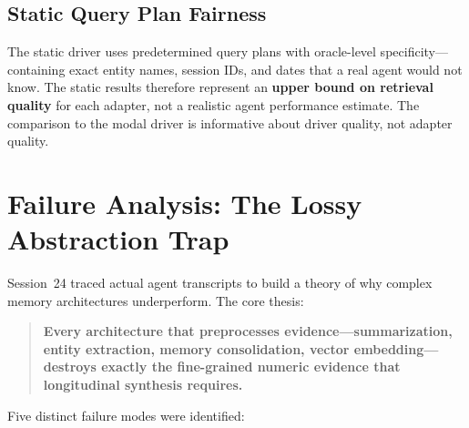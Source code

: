\documentclass[11pt,letterpaper]{article}
\begin{document}
\subsection{Static Query Plan Fairness}

The static driver uses predetermined query plans with oracle-level specificity---containing exact entity names, session IDs, and dates that a real agent would not know. The static results therefore represent an \textbf{upper bound on retrieval quality} for each adapter, not a realistic agent performance estimate. The comparison to the modal driver is informative about driver quality, not adapter quality.

\section{Failure Analysis: The Lossy Abstraction Trap}
\label{sec:failure}

Session~24 traced actual agent transcripts to build a theory of why complex memory architectures underperform. The core thesis:

\begin{quote}
\textbf{Every architecture that preprocesses evidence---summarization, entity extraction, memory consolidation, vector embedding---destroys exactly the fine-grained numeric evidence that longitudinal synthesis requires.}
\end{quote}

Five distinct failure modes were identified:
\end{document}
